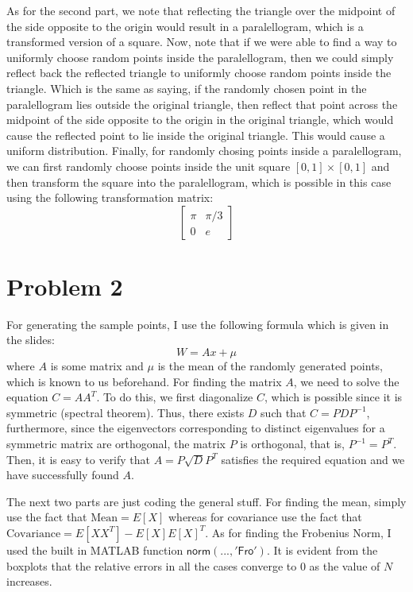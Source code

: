 \documentclass[12pt]{article}
\begin{document}
	As for the second part, we note that reflecting the triangle over the midpoint of the side opposite to the origin would result in a paralellogram, which is a transformed version of a square. Now, note that if we were able to find a way to uniformly choose random points inside the paralellogram, then we could simply reflect back the reflected triangle to uniformly choose random points inside the triangle. Which is the same as saying, if the randomly chosen point in the paralellogram lies outside the original triangle, then reflect that point across the midpoint of the side opposite to the origin in the original triangle, which would cause the reflected point to lie inside the original triangle. This would cause a uniform distribution. Finally, for randomly chosing points inside a paralellogram, we can first randomly choose points inside the unit square $[0,1]\times[0,1]$ and then transform the square into the paralellogram, which is possible in this case using the following transformation matrix:
	\begin{equation*}
		\begin{bmatrix}
			\pi & \pi/3\\
			0 & e
		\end{bmatrix}
	\end{equation*}
	
	\newpage
	\section{Problem 2}
	For generating the sample points, I use the following formula which is given in the slides:
	\begin{equation*}
		W = Ax + \mu 
	\end{equation*}
	where $A$ is some matrix and $\mu$ is the mean of the randomly generated points, which is known to us beforehand. For finding the matrix $A$, we need to solve the equation $C = AA^T$. To do this, we first diagonalize $C$, which is possible since it is symmetric (spectral theorem). Thus, there exists $D$ such that $C = PDP^{-1}$, furthermore, since the eigenvectors corresponding to distinct eigenvalues for a symmetric matrix are orthogonal, the matrix $P$ is orthogonal, that is, $P^{-1} = P^T$. Then, it is easy to verify that $A = P\sqrt{D}P^{T}$ satisfies the required equation and we have successfully found $A$.

	The next two parts are just coding the general stuff. For finding the mean, simply use the fact that $\text{Mean} = E[X]$ whereas for covariance use the fact that $\text{Covariance} = E[XX^T] - E[X]E[X]^T$. As for finding the Frobenius Norm, I used the built in MATLAB function $\mathsf{norm(..., 'Fro')}$. It is evident from the boxplots that the relative errors in all the cases converge to $0$ as the value of $N$ increases.
\end{document}
